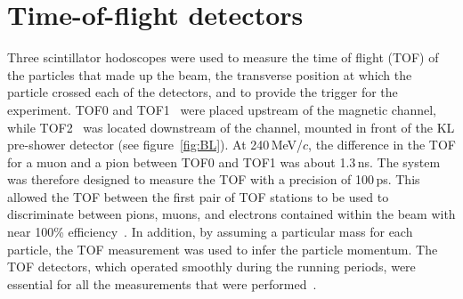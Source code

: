 \graphicspath{{02-TOF/Figures/}}

\newcommand{\Tzero}{\ensuremath{T0}}
\newcommand{\Gauss}{\ensuremath{\text{G}}}
\newcommand{\Dt}{\ensuremath{\Delta t}}
\newcommand{\us}{\ensuremath{\mu\text{s}}}

\section{Time-of-flight detectors}
\label{Sect:TOF}

Three scintillator hodoscopes were used to measure the time of flight
(TOF) of the particles that made up the beam, the transverse position
at which the particle crossed each of the detectors, and to provide
the trigger for the experiment. 
TOF0 and TOF1~\cite{NOTE145,NOTE241,2010NIMPA.615...14B} were
placed upstream of the magnetic channel, while TOF2~\cite{NOTE286}
was located downstream of the channel, mounted in front of the KL
pre-shower detector (see figure~\ref{fig:BL}).
At 240\,MeV/$c$, the difference in the TOF for a muon and a
pion between TOF0 and TOF1 was about 1.3\,ns.
The system was therefore designed to measure the TOF with a
precision of 100\,ps. 
This allowed the TOF between the first pair of TOF stations 
to be used to discriminate between pions, muons, and electrons
contained within the beam with near 100\% efficiency~\cite{2016JInst..11P3001A}.
In addition, by assuming a particular mass for each particle, the
TOF measurement was used to infer the particle
momentum.
The TOF detectors, which operated smoothly during the running periods,
were essential for all the measurements that were
performed~\cite{Bogomilov:2012sr,Adams:2013lba,2015JInst..10P2012A,2016JInst..11P3001A,Adams:2018qhj,Bogomilov:2019kfj}.

